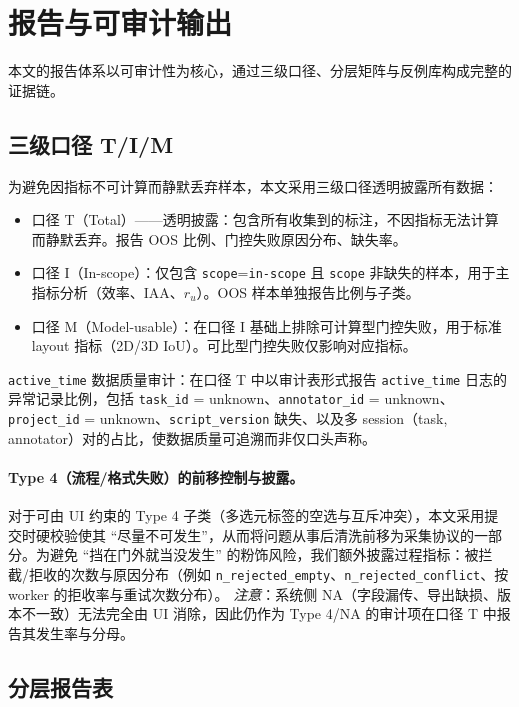 ﻿\section{报告与可审计输出}

本文的报告体系以可审计性为核心，通过三级口径、分层矩阵与反例库构成完整的证据链。
\subsection{三级口径 T/I/M}

为避免因指标不可计算而静默丢弃样本，本文采用三级口径透明披露所有数据：
\begin{itemize}
    \item 口径 T（Total）——透明披露：包含所有收集到的标注，不因指标无法计算而静默丢弃。报告 OOS 比例、门控失败原因分布、缺失率。
    \item 口径 I（In-scope）：仅包含 \texttt{scope}=\texttt{in-scope} 且 \texttt{scope} 非缺失的样本，用于主指标分析（效率、IAA、$r_{u}$）。OOS 样本单独报告比例与子类。
    \item 口径 M（Model-usable）：在口径 I 基础上排除可计算型门控失败，用于标准 layout 指标（2D/3D IoU）。可比型门控失败仅影响对应指标。
\end{itemize}

\texttt{active\_time} 数据质量审计：在口径 T 中以审计表形式报告 \texttt{active\_time} 日志的异常记录比例，包括 \texttt{task\_id} = unknown、\texttt{annotator\_id} = unknown、\texttt{project\_id} = unknown、\texttt{script\_version} 缺失、以及多 session（task, annotator）对的占比，使数据质量可追溯而非仅口头声称。

\paragraph{Type 4（流程/格式失败）的前移控制与披露。}
对于可由 UI 约束的 Type 4 子类（多选元标签的空选与互斥冲突），本文采用提交时硬校验使其 ``尽量不可发生''，从而将问题从事后清洗前移为采集协议的一部分。为避免 ``挡在门外就当没发生'' 的粉饰风险，我们额外披露过程指标：被拦截/拒收的次数与原因分布（例如 \texttt{n\_rejected\_empty}、\texttt{n\_rejected\_conflict}、按 worker 的拒收率与重试次数分布）。
\emph{注意}：系统侧 NA（字段漏传、导出缺损、版本不一致）无法完全由 UI 消除，因此仍作为 Type 4/NA 的审计项在口径 T 中报告其发生率与分母。
\subsection{分层报告表}

